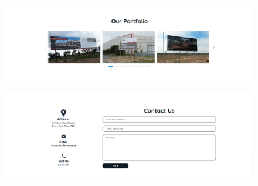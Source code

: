 \documentclass[11pt,a4paper]{article}
\begin{document}
\begin{figure}[H]
	\centering
	\includegraphics[width=\textwidth]{./src/assets/screenshots/portfolio.png}
\end{figure}
	\newpage

\begin{figure}[H]
	\centering
	\includegraphics[width=\textwidth]{./src/assets/screenshots/contact.png}
\end{figure}
	\newpage
\end{document}
